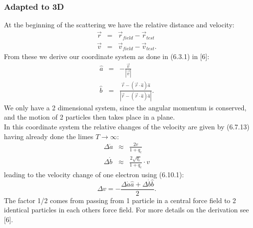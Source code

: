 \subsubsection{Adapted to 3D}
At the beginning of the scattering we have the relative distance and velocity:
\begin{eqnarray} \vec r &=& \vec r_{field} - \vec r_{test} \\
\vec v &=& \vec v_{field} - \vec v_{test} .\end{eqnarray}
From these we derive our coordinate system as done in (6.3.1) in [6]:
\begin{eqnarray}
\hat a &=& - \frac{\vec v}{|\vec v|} \\
\hat b &=& \frac{\vec r - (\vec r \cdot \hat a) \hat a}{|\vec r - (\vec r \cdot \hat a) \hat a|}.
\end{eqnarray}
We only have a 2 dimensional system, since the angular momentum is conserved, and the motion of 2 particles then takes place in a plane.\\
In this coordinate system the relative changes of the velocity are given by (6.7.13) having already done the limes $T \rightarrow \infty$:
\begin{eqnarray}
\Delta \dot a &\approx& \frac{2v}{1 + q_c} \\
\Delta \dot b &\approx& \frac{2 \sqrt{q_c}}{1 + q_c} \cdot v
\end{eqnarray}
leading to the velocity change of one electron using (6.10.1):
\begin{equation} \Delta v = - \frac{\Delta \dot a \hat a + \Delta \dot b \hat b} 2. \end{equation}
The factor 1/2 comes from passing from 1 particle in a central force field to 2 identical particles in each others force field. For more details on the derivation see [6].
